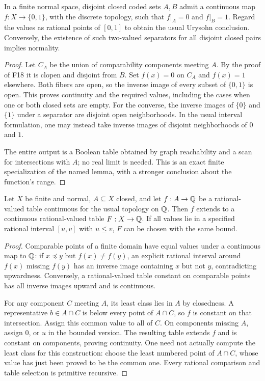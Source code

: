 \begin{theorem}\label{thm:finite-urysohn}
In a finite normal space, disjoint closed coded sets $A,B$ admit
a continuous map $f:X\to\{0,1\}$, with the discrete topology,
such that $f|_A=0$ and $f|_B=1$.  Regard the values as rational
points of $[0,1]$ to obtain the usual Urysohn conclusion.
Conversely, the existence of such two-valued separators for all
disjoint closed pairs implies normality.
\end{theorem}
\begin{proof}
Let $C_A$ be the union of comparability components meeting $A$.
By the proof of F18 it is clopen and disjoint from $B$.  Set
$f(x)=0$ on $C_A$ and $f(x)=1$ elsewhere.  Both fibers are
open, so the inverse image of every subset of $\{0,1\}$ is open.
This proves continuity and the required values, including the
cases when one or both closed sets are empty.  For the converse,
the inverse images of $\{0\}$ and $\{1\}$ under a separator are
disjoint open neighborhoods.  In the usual interval formulation,
one may instead take inverse images of disjoint neighborhoods of
$0$ and $1$.

The entire output is a Boolean table obtained by graph
reachability and a scan for intersections with $A$; no real limit
is needed.  This is an exact finite specialization of the named
lemma, with a stronger conclusion about the function's range.
\end{proof}

\begin{theorem}\label{thm:finite-tietze}
Let $X$ be finite and normal, $A\subseteq X$ closed, and let
$f:A\to\mathbb Q$ be a rational-valued table continuous for the usual
topology on $\mathbb Q$.  Then $f$ extends to a continuous rational-valued
table $F:X\to\mathbb Q$.  If all values lie in a specified rational
interval $[u,v]$ with $u\leq v$, $F$ can be chosen with the same
bound.
\end{theorem}
\begin{proof}
Comparable points of a finite domain have equal values under a
continuous map to $\mathbb Q$: if $x\preceq y$ but $f(x)\ne f(y)$,
an explicit rational interval around $f(x)$ missing $f(y)$ has
an inverse image containing $x$ but not $y$, contradicting
upwardness.  Conversely, a rational-valued table constant on
comparable points has all inverse images upward and is
continuous.

For any component $C$ meeting $A$, its least class lies in $A$
by closedness.  A representative $b\in A\cap C$ is below every
point of $A\cap C$, so $f$ is constant on that intersection.
Assign this common value to all of $C$.  On components missing
$A$, assign $0$, or $u$ in the bounded version.  The resulting
table extends $f$ and is constant on components, proving
continuity.  One need not actually compute the least class for
this construction: choose the least numbered point of
$A\cap C$, whose value has just been proved to be the common
one.  Every rational comparison and table selection is primitive
recursive.
\end{proof}


